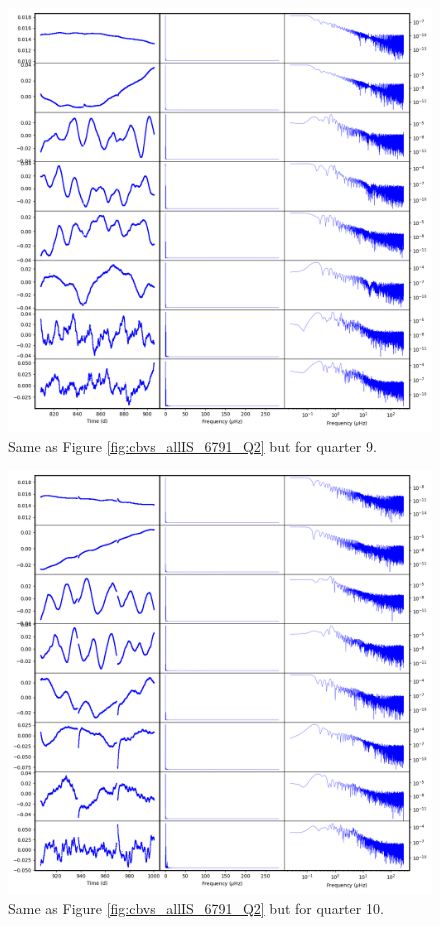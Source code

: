 \begin{figure}
    \centering
    \includegraphics[width=\linewidth]{Chapter_Appended/AppB/cbv_6791_q09.png}
    \caption{Same as Figure \ref{fig:cbvs_allIS_6791_Q2} but for quarter 9.}
    \label{fig:cbvs_allIS_6791_Q09}
\end{figure}


\begin{figure}
    \centering
    \includegraphics[width=\linewidth]{Chapter_Appended/AppB/cbv_6791_q10.png}
    \caption{Same as Figure \ref{fig:cbvs_allIS_6791_Q2} but for quarter 10.}
    \label{fig:cbvs_allIS_6791_Q10}
\end{figure}


